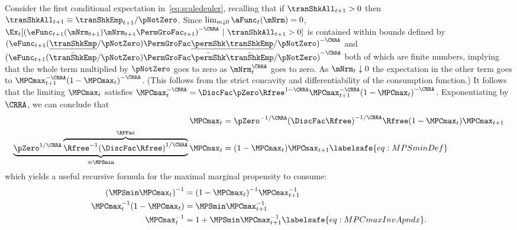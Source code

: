 \documentclass[\econtexRoot/BufferStockTheory]{subfiles}
\begin{document}
Consider the first conditional expectation in~\eqref{eq:scaledeuler},
recalling that if $\tranShkAll_{t+1}>0$ then $\tranShkAll_{t+1} \equiv
\tranShkEmp_{t+1}/\pNotZero$.
Since $\lim_{m \downarrow 0}
\aFunc_{t}(\mNrm) = 0$,
$\Ex_{t}[{(\eFunc_{t+1}(\mNrm_{t+1})\mNrm_{t+1}\PermGroFac_{t+1})}^{-\CRRA}~|~\tranShkAll_{t+1}>0]$
is contained within bounds defined by
${(\eFunc_{t+1}(\underline{\tranShkEmp}/\pNotZero) \PermGroFac\underline{\permShk}
\underline{\tranShkEmp}/\pNotZero)}^{-\CRRA}$ and
${(\eFunc_{t+1}(\bar{\tranShkEmp}/\pNotZero) \PermGroFac\bar{\permShk}
\bar{\tranShkEmp}/\pNotZero)}^{-\CRRA}$ both of which are finite numbers,
implying that the whole term multiplied by $\pNotZero$ goes to zero as
$\mNrm_{t}^{\CRRA}$ goes to zero.
As $\mNrm_{t} \downarrow 0$ the
expectation in the other term goes to $\MPCmax _{t+1}^{-\CRRA
}{(1-\MPCmax _{t})}^{-\CRRA }$.
(This follows from the strict concavity
and differentiability of the consumption function.) It follows that
the limiting $\MPCmax_{t}$ satisfies $\MPCmax_{t}^{-\CRRA }=\DiscFac
\pZero\Rfree^{1-\CRRA }\MPCmax_{t+1}^{-\CRRA }{(1-\MPCmax
_{t})}^{-\CRRA }$.
Exponentiating by $\CRRA$, we can conclude that
\begin{equation}\begin{gathered}\begin{aligned}
\MPCmax_{t} & = \pZero^{-1/\CRRA} {(\DiscFac
\Rfree)}^{-1/\CRRA}\Rfree(1-\MPCmax _{t})\MPCmax _{t+1} \notag
\\ \underbrace{\pZero^{1/\CRRA}\overbrace{{\Rfree}^{-1}{(\DiscFac
    \Rfree)}^{1/\CRRA}}^{\RPFac}}_{\equiv \MPSmin}
\MPCmax_{t} & = (1-\MPCmax _{t})\MPCmax _{t+1} \labelsafe{eq:MPSminDef}
\end{aligned}\end{gathered}\end{equation}
which yields a useful recursive formula for the maximal marginal propensity to consume:
\begin{equation}\begin{gathered}\begin{aligned}
  {(\MPSmin \MPCmax_{t})}^{-1}  & = {(1-\MPCmax_{t})}^{-1}\MPCmax_{t+1}^{-1}  \notag
\\ \MPCmax_{t}^{-1}(1-\MPCmax_{t})  & = \MPSmin \MPCmax_{t+1}^{-1}   \notag
\\ \MPCmax_{t}^{-1}  & = 1+\MPSmin \MPCmax_{t+1}^{-1} \labelsafe{eq:MPCmaxInvApndx}.
\end{aligned}\end{gathered}\end{equation}
\end{document}

